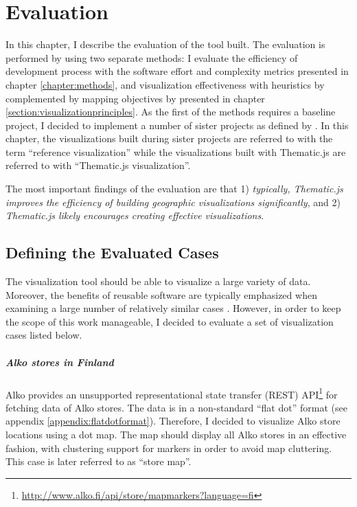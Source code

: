 
\chapter{Evaluation}
\label{chapter:evaluation}

In this chapter, I describe the evaluation of the tool built. The evaluation is performed by using two separate methods: I evaluate the efficiency of development process with the software effort and complexity metrics presented in chapter \ref{chapter:methods}, and visualization effectiveness with heuristics by \citet{zuk_heuristics_2006} complemented by mapping objectives by \citet{schlichtmann_visualization_2002} presented in chapter \ref{section:visualizationprinciples}. As the first of the methods requires a baseline project, I decided to implement a number of sister projects as defined by \citet{kitchenham_evaluating_1998}. In this chapter, the visualizations built during sister projects are referred to with the term ``reference visualization'' while the visualizations built with Thematic.js are referred to with ``Thematic.js visualization''.

The most important findings of the evaluation are that 1) \emph{typically, Thematic.js improves the efficiency of building geographic visualizations significantly}, and 2) \emph{Thematic.js likely encourages creating effective visualizations}.

\section{Defining the Evaluated Cases}
\label{section:evaluatedcases}

The visualization tool should be able to visualize a large variety of data. Moreover, the benefits of reusable software are typically emphasized when examining a large number of relatively similar cases \citep{frakes_software_1996}. However, in order to keep the scope of this work manageable, I decided to evaluate a set of visualization cases listed below.

\paragraph{Alko stores in Finland}
Alko provides an unsupported representational state transfer (REST) API\footnote{\url{http://www.alko.fi/api/store/mapmarkers?language=fi}} for fetching data of Alko stores. The data is in a non-standard ``flat dot'' format (see appendix \ref{appendix:flatdotformat}). Therefore, I decided to visualize Alko store locations using a dot map. The map should display all Alko stores in an effective fashion, with clustering support for markers in order to avoid map cluttering. This case is later referred to as ``store map''.

